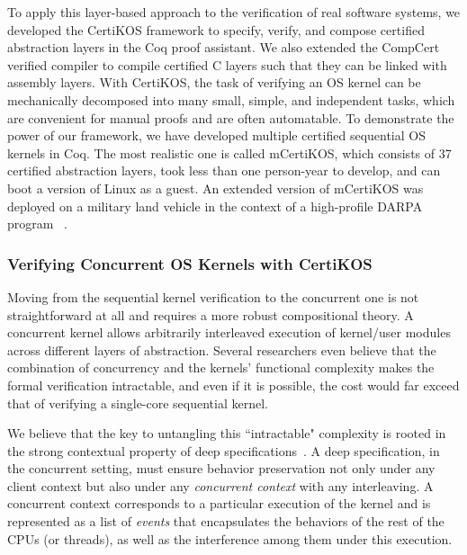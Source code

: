 \documentclass[a4paper, 10pt]{article}
\begin{document}
\begin{small}
To apply this layer-based approach to the verification of real software systems,
we developed the CertiKOS framework to  specify,  verify,  and compose certified abstraction layers  in the Coq proof assistant.
We also extended
the CompCert verified compiler to compile certified C layers such
that they can be linked with assembly layers.
With CertiKOS, the task of verifying an  OS kernel
can be mechanically decomposed into many small, simple, and
independent tasks, which are convenient for manual proofs and are often automatable.
To demonstrate the power of our  framework,
 we have developed multiple certified
sequential OS kernels in Coq. 
The most realistic one is called mCertiKOS,
which consists of 37 certified abstraction layers, 
took less than one person-year to develop,
and can boot a version of Linux as a guest.
An extended version of mCertiKOS was deployed on a military land vehicle in the context of a high-profile  DARPA program
~\cite{hacms}.

\subsubsection*{\small Verifying Concurrent OS Kernels with CertiKOS}
Moving from the sequential kernel verification
to the concurrent one is not straightforward at all
and requires a more robust compositional theory.
A concurrent kernel allows arbitrarily  interleaved
execution of kernel/user modules across different
layers of abstraction. 
Several researchers even believe that the combination of concurrency and the kernels' functional complexity makes the formal verification intractable,
and even if it is possible, the cost would far exceed that of
verifying a single-core sequential kernel.

We believe that the key to untangling this ``intractable" complexity is rooted in the
strong contextual property of deep specifications~\cite{osdi16-gu, pldi18-gu}.
A deep specification, in the concurrent setting, must ensure    behavior preservation not only under any client context but also under
any \emph{concurrent context} with any interleaving.
A  concurrent context corresponds to
a particular execution of the kernel  and is represented as a list of \emph{events} that encapsulates the behaviors of the rest of the CPUs (or threads), as well as the interference
among them under this  execution.


\end{small}
\end{document}
